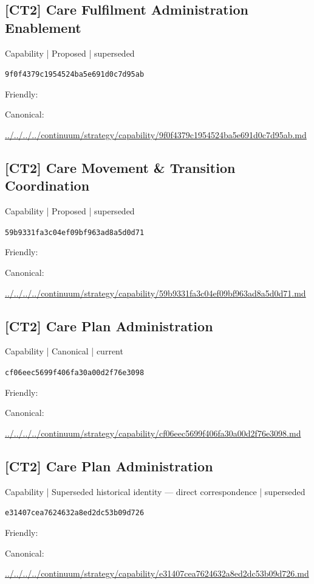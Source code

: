 \documentclass[10pt,a4paper]{article}
\begin{document}
\subsection*{[CT2] Care Fulfilment Administration Enablement}
{\small Capability | Proposed | superseded}\par
\texttt{9f0f4379c1954524ba5e691d0c7d95ab}\par
Friendly: \par
Canonical: \par
{\footnotesize\url{../../../../continuum/strategy/capability/9f0f4379c1954524ba5e691d0c7d95ab.md}}\par
\subsection*{[CT2] Care Movement \& Transition Coordination}
{\small Capability | Proposed | superseded}\par
\texttt{59b9331fa3c04ef09bf963ad8a5d0d71}\par
Friendly: \par
Canonical: \par
{\footnotesize\url{../../../../continuum/strategy/capability/59b9331fa3c04ef09bf963ad8a5d0d71.md}}\par
\subsection*{[CT2] Care Plan Administration}
{\small Capability | Canonical | current}\par
\texttt{cf06eec5699f406fa30a00d2f76e3098}\par
Friendly: \par
Canonical: \par
{\footnotesize\url{../../../../continuum/strategy/capability/cf06eec5699f406fa30a00d2f76e3098.md}}\par
\subsection*{[CT2] Care Plan Administration}
{\small Capability | Superseded historical identity — direct correspondence | superseded}\par
\texttt{e31407cea7624632a8ed2dc53b09d726}\par
Friendly: \par
Canonical: \par
{\footnotesize\url{../../../../continuum/strategy/capability/e31407cea7624632a8ed2dc53b09d726.md}}\par
\end{document}
